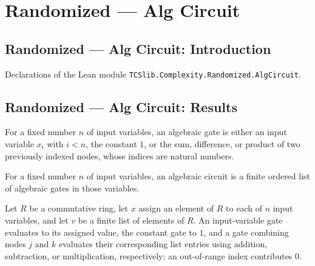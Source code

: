 \section{Randomized --- Alg Circuit}
\subsection*{Randomized --- Alg Circuit: Introduction}

Declarations of the Lean module \texttt{TCSlib.Complexity.Randomized.AlgCircuit}.

\subsection*{Randomized --- Alg Circuit: Results}

\begin{definition}
\label{Randomized.AlgGate}
\leanok
For a fixed number $n$ of input variables, an algebraic gate is either an input variable
$x_i$ with $i<n$, the constant $1$, or the sum, difference, or product of two previously
indexed nodes, whose indices are natural numbers.
\end{definition}

\begin{definition}
\label{Randomized.AlgCircuit}
\leanok
{}
For a fixed number $n$ of input variables, an algebraic circuit is a finite ordered list
of algebraic gates in those variables.
\end{definition}

\begin{definition}
\label{Randomized.AlgGate.eval}
\leanok
{}
Let $R$ be a commutative ring, let $x$ assign an element of $R$ to each of $n$ input
variables, and let $v$ be a finite list of elements of $R$. An input-variable gate
evaluates to its assigned value, the constant gate to $1$, and a gate combining nodes
$j$ and $k$ evaluates their corresponding list entries using addition, subtraction, or
multiplication, respectively; an out-of-range index contributes $0$.
\end{definition}

